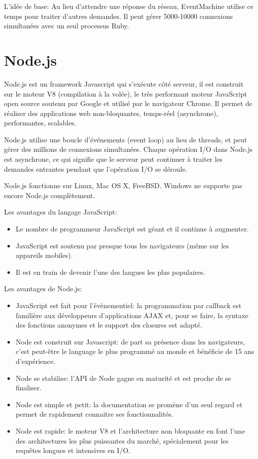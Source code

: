 \documentclass[a4paper,10pt]{report}
\begin{document}
L'idée de base: Au lieu d'attendre une réponse du réseau, EventMachine utilise ce temps pour traiter d'autres demandes. Il peut gérer 5000-10000 connexions simultanées avec un seul processus Ruby. 

  \section{Node.js}
Node.js est un framework Javascript qui s'exécute côté serveur, il est construit sur le moteur V8 (compilation à la volée), le très performant moteur JavaScript open source soutenu par Google et utilisé par le navigateur Chrome. Il permet de réaliser des applications web non-bloquantes, temps-réel (asynchrone), performantes, scalables.


Node.js utilise une boucle d'événements (event loop) au lieu de threads, et peut gérer des millions de connexions simultanées. Chaque opération I/O dans Node.js est asynchrone, ce qui signifie que le serveur peut continuer à traiter les demandes entrantes pendant que l’opération I/O se déroule.


Node.js fonctionne sur Linux, Mac OS X, FreeBSD. Windows ne supporte pas encore Node.js complètement.


Les avantages du langage JavaScript:
\begin{itemize}
 \item Le nombre de programmeur JavaScript est géant et il continue à augmenter.
 \item JavaScript est soutenu par presque tous les navigateurs (même sur les appareils mobiles).
 \item Il est en train de devenir l'une des langues les plus populaires.
\end{itemize}


Les avantages de Node.js:
\begin{itemize}
 \item JavaScript est fait pour l'évènementiel: la programmation par callback est familière aux développeurs d'applications AJAX et, pour se faire, la syntaxe des fonctions anonymes et le support des closures est adapté.
 \item Node est construit sur Javascript: de part sa présence dans les navigateurs, c'est peut-être le language le plus programmé au monde et bénéficie de 15 ans d'expérience.
 \item Node se stabilise: l'API de Node gagne en maturité et est proche de se finaliser.
 \item Node est simple et petit: la documentation se promène d'un seul regard et permet de rapidement connaitre ses fonctionnalités.
 \item Node est rapide: le moteur V8 et l'architecture non bloquante en font l'une des architectures les plus puissantes du marché, spécialement pour les requêtes longues et intensives en I/O. 
\end{itemize}
\end{document}
